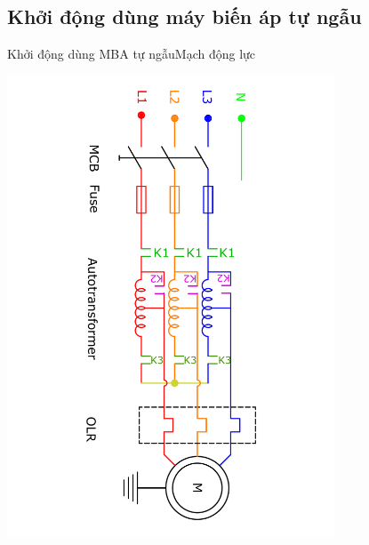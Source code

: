 \documentclass[17pt]{beamer}
\begin{document}
\subsection*{Khởi động dùng máy biến áp tự ngẫu}
\begin{frame}{Khởi động dùng MBA tự ngẫu}{Mạch động lực}
\vspace{-2.5cm}
\begin{center}
\includegraphics[width = 0.73\textwidth,angle=90]{../sodomach/sodomach-bc-chude1-3.pdf}
\end{center}
\end{frame}
\end{document}
